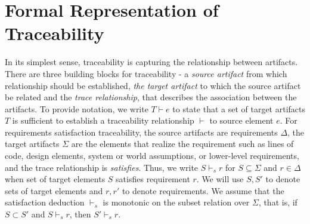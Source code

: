 \section{Formal Representation of Traceability}
\label{sec:motivation}
\newcommand{\satisfies}{\vdash_{\!\!s}}
\newcommand{\nsatisfies}{\nvdash_{\!\!s}}

In its simplest sense, traceability is capturing the relationship between artifacts. There are three building blocks for traceability - a \emph{source artifact} from which relationship should be established, \emph{the target artifact} to which the source artifact be related and the \emph{trace relationship}, that describes the association between the artifacts.  To provide notation, we write $T \vdash e$ to state that a set of target artifacts $T$ is sufficient to establish a traceability relationship $\vdash$ to source element $e$.
For requirements satisfaction traceability, the source artifacts are requirements $\Delta$, the target artifacts $\Sigma$ are the elements that realize the requirement such as lines of code, design elements, system or world assumptions, or lower-level requirements, and the trace relationship is \emph{satisfies}.  Thus, we write $S \satisfies r$ for $S \subseteq \Sigma$ and $r \in \Delta$ when set of target elements $S$ satisfies requirement $r$.  We will use $S, S'$ to denote sets of target elements and $r, r'$ to denote requirements.
%
%
%
%
We assume that the satisfaction deduction $\satisfies$ is monotonic on the subset relation over $\Sigma$, that is, if $S \subset S'$ and $S \satisfies r$, then $S' \satisfies r$.

